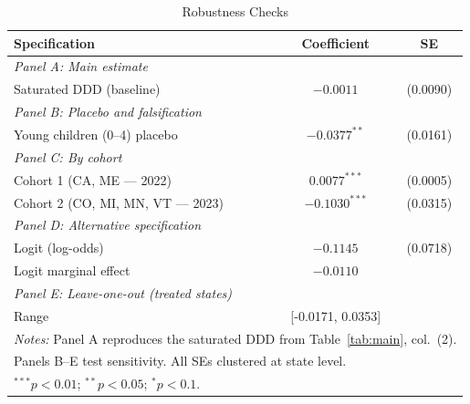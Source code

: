 \begin{table}[t]
\centering
\caption{Robustness Checks}
\label{tab:robust}
\begin{tabular}{lcc}
\hline\hline
Specification & Coefficient & SE \\
\hline
\textit{Panel A: Main estimate} & & \\
\quad Saturated DDD (baseline) & $-0.0011$ & (0.0090) \\
\addlinespace
\textit{Panel B: Placebo and falsification} & & \\
\quad Young children (0--4) placebo & $-0.0377^{**}$ & (0.0161) \\
\addlinespace
\textit{Panel C: By cohort} & & \\
\quad Cohort 1 (CA, ME --- 2022) & $0.0077^{***}$ & (0.0005) \\
\quad Cohort 2 (CO, MI, MN, VT --- 2023) & $-0.1030^{***}$ & (0.0315) \\
\addlinespace
\textit{Panel D: Alternative specification} & & \\
\quad Logit (log-odds) & $-0.1145$ & (0.0718) \\
\quad Logit marginal effect & $-0.0110$ & \\
\addlinespace
\textit{Panel E: Leave-one-out (treated states)} & & \\
\quad Range & [-0.0171, 0.0353] & \\
\hline
\multicolumn{3}{l}{\footnotesize \textit{Notes:} Panel A reproduces the saturated DDD from Table~\ref{tab:main}, col.~(2).} \\
\multicolumn{3}{l}{\footnotesize Panels B--E test sensitivity. All SEs clustered at state level.} \\
\multicolumn{3}{l}{\footnotesize $^{***}p<0.01$; $^{**}p<0.05$; $^{*}p<0.1$.} \\
\end{tabular}
\end{table}
